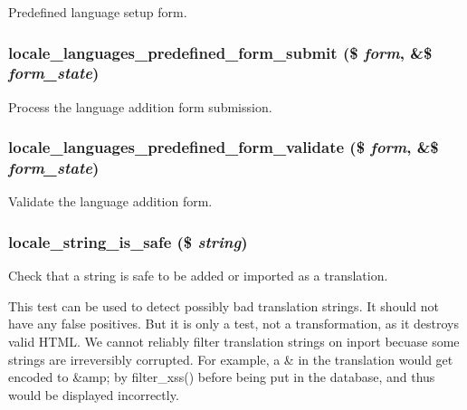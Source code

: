 Predefined language setup form. \hypertarget{group__locale_g83df19c32a63b094d033d0802d74d7cd}{
\subsubsection[{locale\_\-languages\_\-predefined\_\-form\_\-submit}]{\setlength{\rightskip}{0pt plus 5cm}locale\_\-languages\_\-predefined\_\-form\_\-submit (\$ {\em form}, \/  \&\$ {\em form\_\-state})}}
\label{group__locale_g83df19c32a63b094d033d0802d74d7cd}


Process the language addition form submission. \hypertarget{group__locale_g4298724abc57b7d2622a2c9642b4f742}{
\subsubsection[{locale\_\-languages\_\-predefined\_\-form\_\-validate}]{\setlength{\rightskip}{0pt plus 5cm}locale\_\-languages\_\-predefined\_\-form\_\-validate (\$ {\em form}, \/  \&\$ {\em form\_\-state})}}
\label{group__locale_g4298724abc57b7d2622a2c9642b4f742}


Validate the language addition form. \hypertarget{group__locale_g60fba74a6fc736cec4df566aa165ca14}{
\subsubsection[{locale\_\-string\_\-is\_\-safe}]{\setlength{\rightskip}{0pt plus 5cm}locale\_\-string\_\-is\_\-safe (\$ {\em string})}}
\label{group__locale_g60fba74a6fc736cec4df566aa165ca14}


Check that a string is safe to be added or imported as a translation.

This test can be used to detect possibly bad translation strings. It should not have any false positives. But it is only a test, not a transformation, as it destroys valid HTML. We cannot reliably filter translation strings on inport becuase some strings are irreversibly corrupted. For example, a \& in the translation would get encoded to \&amp; by filter\_\-xss() before being put in the database, and thus would be displayed incorrectly.

